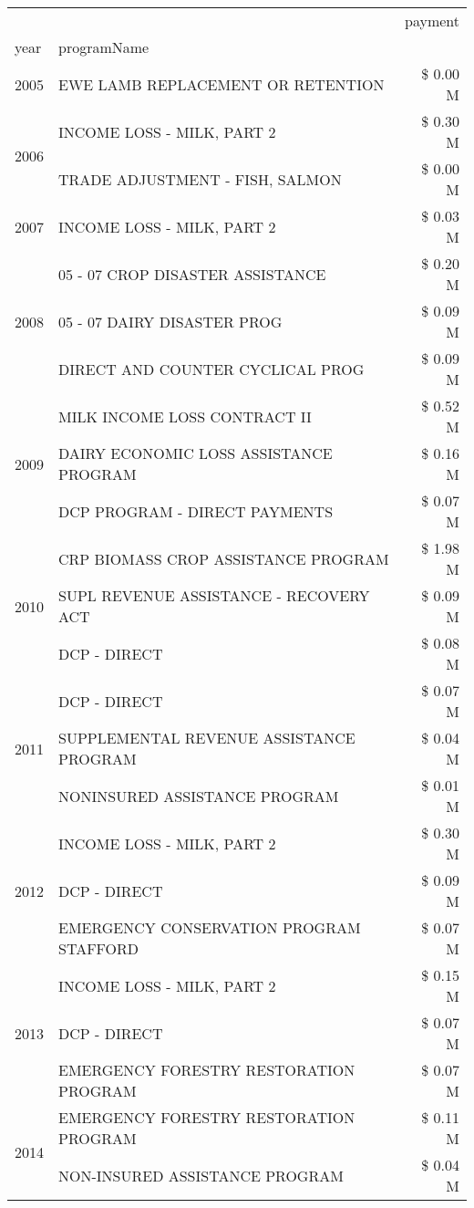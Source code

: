 \begin{tabular}{llr}
\toprule
 &  & payment \\
year & programName &  \\
\midrule
2005 & EWE LAMB REPLACEMENT OR RETENTION & \$ 0.00 M \\
\cline{1-3}
\multirow[t]{2}{*}{2006} & INCOME LOSS - MILK, PART 2 & \$ 0.30 M \\
 & TRADE ADJUSTMENT - FISH, SALMON & \$ 0.00 M \\
\cline{1-3}
2007 & INCOME LOSS - MILK, PART 2 & \$ 0.03 M \\
\cline{1-3}
\multirow[t]{3}{*}{2008} & 05 - 07 CROP DISASTER ASSISTANCE & \$ 0.20 M \\
 & 05 - 07 DAIRY DISASTER PROG & \$ 0.09 M \\
 & DIRECT AND COUNTER CYCLICAL PROG & \$ 0.09 M \\
\cline{1-3}
\multirow[t]{3}{*}{2009} & MILK INCOME LOSS CONTRACT II & \$ 0.52 M \\
 & DAIRY ECONOMIC LOSS ASSISTANCE PROGRAM & \$ 0.16 M \\
 & DCP PROGRAM - DIRECT PAYMENTS & \$ 0.07 M \\
\cline{1-3}
\multirow[t]{3}{*}{2010} & CRP BIOMASS CROP ASSISTANCE PROGRAM & \$ 1.98 M \\
 & SUPL REVENUE ASSISTANCE - RECOVERY ACT & \$ 0.09 M \\
 & DCP - DIRECT & \$ 0.08 M \\
\cline{1-3}
\multirow[t]{3}{*}{2011} & DCP - DIRECT & \$ 0.07 M \\
 & SUPPLEMENTAL REVENUE ASSISTANCE PROGRAM & \$ 0.04 M \\
 & NONINSURED ASSISTANCE PROGRAM & \$ 0.01 M \\
\cline{1-3}
\multirow[t]{3}{*}{2012} & INCOME LOSS - MILK, PART 2 & \$ 0.30 M \\
 & DCP - DIRECT & \$ 0.09 M \\
 & EMERGENCY CONSERVATION PROGRAM STAFFORD & \$ 0.07 M \\
\cline{1-3}
\multirow[t]{3}{*}{2013} & INCOME LOSS - MILK, PART 2 & \$ 0.15 M \\
 & DCP - DIRECT & \$ 0.07 M \\
 & EMERGENCY FORESTRY RESTORATION PROGRAM & \$ 0.07 M \\
\cline{1-3}
\multirow[t]{3}{*}{2014} & EMERGENCY FORESTRY RESTORATION PROGRAM & \$ 0.11 M \\
 & NON-INSURED ASSISTANCE PROGRAM & \$ 0.04 M \\

\end{tabular}
